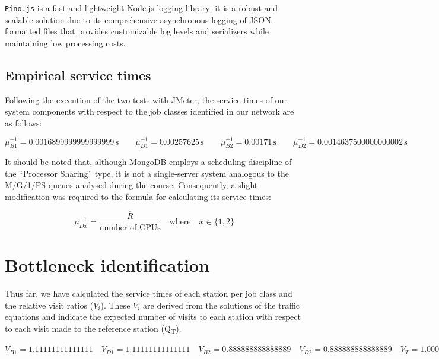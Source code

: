 \verb|Pino.js| is a fast and lightweight Node.js logging library: it is a robust and scalable solution due to its comprehensive asynchronous logging of JSON-formatted files that provides customizable log levels and serializers while maintaining low processing costs.

\subsection{Empirical service times}

Following the execution of the two tests with JMeter, the service times of our system components with respect to the job classes identified in our network are as follows:

\[
\mu^{-1}_{B1} = \num[round-mode=places, round-precision=5]{0.0016899999999999999} \, \text{s}
\quad \quad
\mu^{-1}_{D1} = \num[round-mode=places, round-precision=5]{0.00257625} \, \text{s}
\quad \quad
\mu^{-1}_{B2} = \num[round-mode=places, round-precision=5]{0.00171} \, \text{s}
\quad \quad
\mu^{-1}_{D2} = \num[round-mode=places, round-precision=5]{0.0014637500000000002} \, \text{s}
\]

It should be noted that, although MongoDB employs a scheduling discipline of the ``Processor Sharing'' type, it is not a single-server system analogous to the M/G/1/PS queues analysed during the course.
Consequently, a slight modification was required to the formula for calculating its service times:

\[
	\mu^{-1}_{Dx} = \frac{\overline{R}}{\text{number of CPUs}} \quad \text{where} \quad x \in \{1, 2\}
\]

\section{Bottleneck identification}

Thus far, we have calculated the service times of each station per job class and the relative visit ratios ($\overline{V}_{i}$).
These $\overline{V}_{i}$ are derived from the solutions of the traffic equations and indicate the expected number of visits to each station with respect to each visit made to the reference station (Q\textsubscript{T}).

\[
\overline{V}_{B1} = \num[round-mode=places, round-precision=5]{1.11111111111111}
\quad
\overline{V}_{D1} = \num[round-mode=places, round-precision=5]{1.11111111111111}
\quad
\overline{V}_{B2} = \num[round-mode=places, round-precision=5]{0.888888888888889}
\quad
\overline{V}_{D2} = \num[round-mode=places, round-precision=5]{0.888888888888889}
\quad
\overline{V}_{T} = \num[round-mode=places, round-precision=5]{1.00000000000000}
\]

